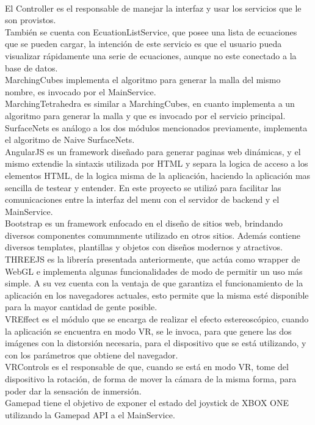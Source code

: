 \documentclass[12pt]{article}
\begin{document}
\\El Controller es el responsable de manejar la interfaz y usar los servicios que le son provistos.
\\También se cuenta con EcuationListService, que posee una lista de ecuaciones que se pueden cargar, la intención de este servicio es que el usuario pueda visualizar rápidamente una serie de ecuaciones, aunque no este conectado a la base de datos.
\\MarchingCubes implementa el algoritmo para generar la malla del mismo nombre, es invocado por el MainService.
\\MarchingTetrahedra es similar a MarchingCubes, en cuanto implementa a un algoritmo para generar la malla y que es invocado por el servicio principal.
\\SurfaceNets es análogo a los dos módulos mencionados previamente, implementa el algoritmo de Naive SurfaceNets.
\\AngularJS es un framework diseñado para generar paginas web dinámicas, y el mismo extendie la sintaxis utilizada por HTML y separa la logica de acceso a los elementos HTML, de la logica misma de la aplicación, haciendo la aplicación mas sencilla de testear y entender. En este proyecto se utilizó para facilitar las comunicaciones entre la interfaz del menu con el servidor de backend y el MainService.
\\Bootstrap es un framework enfocado en el diseño de sitios web, brindando diversos componentes comumnmente utilizado en otros sitios. Además contiene diversos templates, plantillas y objetos con diseños modernos y atractivos. 
\\THREEJS es la librería presentada anteriormente, que actúa como wrapper de WebGL e implementa algunas funcionalidades de modo de permitir un uso más simple. A su vez cuenta con la ventaja de que garantiza el funcionamiento de la aplicación en los navegadores actuales, esto permite que la misma esté disponible para la mayor cantidad de gente posible.
\\VREffect es el módulo que se encarga de realizar el efecto estereoscópico, cuando la aplicación se encuentra en modo VR, se le invoca, para que genere las dos imágenes con la distorsión necesaria, para el dispositivo que se está utilizando, y con los parámetros que obtiene del navegador.
\\VRControls es el responsable de que, cuando se está en modo VR, tome del dispositivo la rotación, de forma de mover la cámara de la misma forma, para poder dar la sensación de inmersión.
\\Gamepad tiene el objetivo de exponer el estado del joystick de XBOX ONE utilizando la Gamepad API\cite{gamepadapi} a el MainService.
\end{document}
